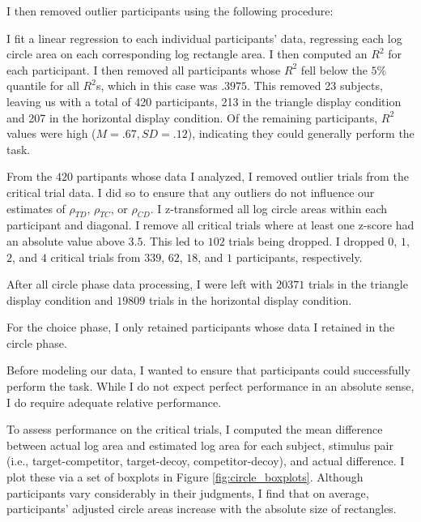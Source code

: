 {{I then removed outlier participants using the following procedure:

I fit a linear regression to each individual participants' data, regressing each log circle area on each corresponding log rectangle area. I then computed an $R^2$ for each participant. I then removed all participants whose $R^2$ fell below the $5\%$ quantile for all $R^2$s, which in this case was $.3975$. This removed 23 subjects, leaving us with a total of 420 participants, 213 in the triangle display condition and 207 in the horizontal display condition. Of the remaining participants, $R^2$ values were high ($M=.67,SD=.12$), indicating they could generally perform the task.

From the $420$ partipants whose data I analyzed, I removed outlier trials from the critical trial data. I did so to ensure that any outliers do not influence our estimates of $\rho_{TD}$, $\rho_{TC}$, or $\rho_{CD}$. I z-transformed all log circle areas within each participant and diagonal. I remove all critical trials where at least one z-score had an absolute value above $3.5$. This led to $102$ trials being dropped. I dropped $0$, $1$, $2$, and $4$ critical trials from $339$, $62$, $18$, and $1$ participants, respectively. 

After all circle phase data processing, I were left with $20371$ trials in the triangle display condition and $19809$ trials in the horizontal display condition. 

For the choice phase, I only retained participants whose data I retained in the circle phase.

Before modeling our data, I wanted to ensure that participants could successfully perform the task. While I do not expect perfect performance in an absolute sense, I do require adequate relative performance. 

To assess performance on the critical trials, I computed the mean difference between actual log area and estimated log area for each subject, stimulus pair (i.e., target-competitor, target-decoy, competitor-decoy), and actual difference. I plot these via a set of boxplots in Figure \ref{fig:circle_boxplots}. Although participants vary considerably in their judgments, I find that on average, participants' adjusted circle areas increase with the absolute size of rectangles. 


}}
